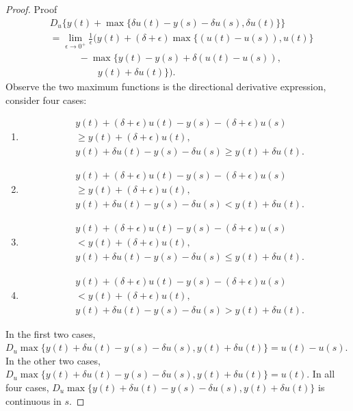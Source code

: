 \documentclass[11pt,leqno]{amsart}
\begin{document}
\begin{proof}{Proof}
\begin{align*}
    &D_u \Bigg\{ y(t) + 
        \max\Big\{\delta u(t) - y(s) - \delta u(s),\delta u(t) \Big\} 
    \Bigg\} \\
    &= \lim_{\epsilon \to 0^+} \frac{1}{\epsilon} \Bigg( 
        y(t) + (\delta + \epsilon) \max\Big\{ (u(t) - u(s)), u(t) \Big\} \\
    &\qquad\quad - \max\Big\{ y(t)- y(s) + \delta (u(t)  - u(s)), \\
    &\qquad \qquad\quad y(t) + \delta u(t) \Big\} 
    \Bigg).
\end{align*}
Observe the two maximum functions is the directional derivative expression, consider four cases:
\begin{enumerate}
    \item 
    \begin{align*}
        &y(t)+(\delta+\epsilon)u(t)-y(s)-(\delta+\epsilon)u(s)\\&\geq y(t)+(\delta+\epsilon)u(t),\\
        &y(t)+\delta u(t)-y(s)-\delta u(s)\geq y(t)+\delta u(t).
    \end{align*}
    \item 
    \begin{align*}
        &y(t)+(\delta+\epsilon)u(t)-y(s)-(\delta+\epsilon)u(s)\\&\geq y(t)+(\delta+\epsilon)u(t),\\
        &y(t)+\delta u(t)-y(s)-\delta u(s)< y(t)+\delta u(t).
    \end{align*}\item 
    \begin{align*}
        &y(t)+(\delta+\epsilon)u(t)-y(s)-(\delta+\epsilon)u(s)\\&< y(t)+(\delta+\epsilon)u(t),\\
        &y(t)+\delta u(t)-y(s)-\delta u(s)\leq y(t)+\delta u(t).
    \end{align*}\item 
    \begin{align*}
        &y(t)+(\delta+\epsilon)u(t)-y(s)-(\delta+\epsilon)u(s)\\&< y(t)+(\delta+\epsilon)u(t),\\
        &y(t)+\delta u(t)-y(s)-\delta u(s)> y(t)+\delta u(t).
    \end{align*}
\end{enumerate}
In the first two cases, $D_u \max\{y(t)+\delta u(t)-y(s)-\delta u(s), y(t)+\delta u(t)\}=u(t)-u(s)$. In the other two cases, $D_u \max\{y(t)+\delta u(t)-y(s)-\delta u(s), y(t)+\delta u(t)\}=u(t)$. In all four cases, $D_u \max\{y(t)+\delta u(t)-y(s)-\delta u(s), y(t)+\delta u(t)\}$ is continuous in $s$.

\end{proof}
\end{document}
